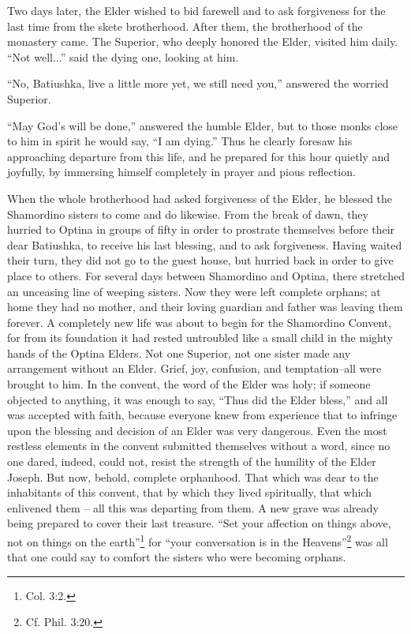 Two days later, the Elder wished to bid farewell and to ask forgiveness for the last time from the skete brotherhood. After them, the brotherhood of the monastery came. The Superior, who deeply honored the Elder, visited him daily. ``Not well...'' said the dying one, looking at him.

``No, Batiushka, live a little more yet, we still need you,'' answered the worried Superior.

``May God's will be done,'' answered the humble Elder, but to those monks close to him in spirit he would say, ``I am dying.'' Thus he clearly foresaw his approaching departure from this life, and he prepared for this hour quietly and joyfully, by immersing himself completely in prayer and pious reflection.

When the whole brotherhood had asked forgiveness of the Elder, he blessed the Shamordino sisters to come and do likewise. From the break of dawn, they hurried to Optina in groups of fifty in order to prostrate themselves before their dear Batiushka, to receive his last blessing, and to ask forgiveness. Having waited their turn, they did not go to the guest house, but hurried back in order to give place to others. For several days between Shamordino and Optina, there stretched an unceasing line of weeping sisters. Now they were left complete orphans; at home they had no mother, and their loving guardian and father was leaving them forever. A completely new life was about to begin for the Shamordino Convent, for from its foundation it had rested untroubled like a small child in the mighty hands of the Optina Elders. Not one Superior, not one sister made any arrangement without an Elder. Grief, joy, confusion, and temptation--all were brought to him. In the convent, the word of the Elder was holy; if someone objected to anything, it was enough to say, ``Thus did the Elder bless,'' and all was accepted with faith, because everyone knew from experience that to infringe upon the blessing and decision of an Elder was very dangerous. Even the most restless elements in the convent submitted themselves without a word, since no one dared, indeed, could not, resist the strength of the humility of the Elder Joseph. But now, behold, complete orphanhood. That which was dear to the inhabitants of this convent, that by which they lived spiritually, that which enlivened them -- all this was departing from them. A new grave was already being prepared to cover their last treasure. ``Set your affection on things above, not on things on the earth''\footnote{Col. 3:2.} for ``your conversation is in the Heavens''\footnote{Cf. Phil. 3:20.} was all that one could say to comfort the sisters who were becoming orphans.

